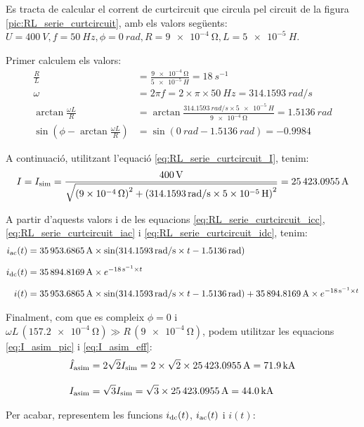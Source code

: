\begin{exemple}\label{ex:CurtcircuitRL}
	\addcontentsxms{\CurtcircuitRL}		
    Es tracta de calcular el corrent de curtcircuit que circula pel circuit de la figura \vref{pic:RL_serie_curtcircuit}, amb els valors següents: $U=\qty{400}{V}, f=\qty{50}{Hz}, \phi=\qty{0}{rad}, R=\qty{9e-4}{\ohm}, L=\qty{5e-5}{H}$.

    Primer calculem els valors:
    \begin{align*}
    	\frac{R}{L} &= \frac{\qty{9e-4}{\ohm}}{\qty{5e-5}{H}} = \qty{18}{s^{-1}} \\[3mm]
        \omega &= 2\pi f = 2\times\pi\times\qty{50}{Hz} = \qty{314,1593}{rad/s} \\[3mm]
        \arctan\frac{\omega L}{R} &= \arctan\frac{\qty{314,1593}{rad/s}\times\qty{5e-5}{H}}{\qty{9e-4}{\ohm}} =
        \qty{1,5136}{rad}\\[3mm]
        \sin\left(\phi - \arctan\frac{\omega L}{R}\right) &= \sin(\qty{0}{rad} - \qty{1,5136}{rad})= \num{-0,9984}
    \end{align*}


    A continuació, utilitzant l'equació \eqref{eq:RL_serie_curtcircuit_I}, tenim:
    \[
        I= I_\mathrm{sim} =\frac{\qty{400}{V}}{\sqrt{\left(\qty{9e-4}{\ohm}\right)^2+\left(\qty{314,1593}{rad/s}\times \qty{5e-5}{H}\right)^2}} =
        \qty{25423,0955}{A}
    \]

      A partir d'aquests valors i de les equacions \eqref{eq:RL_serie_curtcircuit_icc}, \eqref{eq:RL_serie_curtcircuit_iac} i \eqref{eq:RL_serie_curtcircuit_idc}, tenim:
    \begin{align*}
        i_\mathrm{ac}(t) &= \qty{35953,6865}{A} \times \sin(\qty{314,1593}{rad/s} \times t - \qty{1,5136}{rad}) \\[0.2cm]
        i_\mathrm{dc}(t) &= \qty{35894,8169}{A} \times e^{-\qty{18}{s^{-1}} \times t}\\[0.2cm]
        i(t) &= \qty{35953,6865}{A} \times \sin(\qty{314,1593}{rad/s} \times t - \qty{1,5136}{rad}) + \qty{35894,8169}{A} \times e^{-\qty{18}{s^{-1}} \times  t}
    \end{align*}

    Finalment, com que es compleix $\phi=0$ i $\omega L \,(\qty{157,2e-4}{\ohm}) \gg R\, (\qty{9e-4}{\ohm}) $, podem utilitzar les equacions \eqref{eq:I_asim_pic} i \eqref{eq:I_asim_eff}:
    \begin{align*}
        \hat{I}_\mathrm{asim} &= 2 \sqrt{2} I_\mathrm{sim}= 2 \times \sqrt{2} \times \qty{25423,0955}{A} = \qty{71,9}{kA}\\[0.3cm]
        I_\mathrm{asim} &= \sqrt{3} I_\mathrm{sim}= \sqrt{3} \times \qty{25423,0955}{A} = \qty{44,0}{kA}
    \end{align*}

    Per acabar, representem les funcions $i_\mathrm{dc}(t)$, $i_\mathrm{ac}(t)$ i $i(t)$:
    \begin{center}
        
    \end{center}
\end{exemple}


